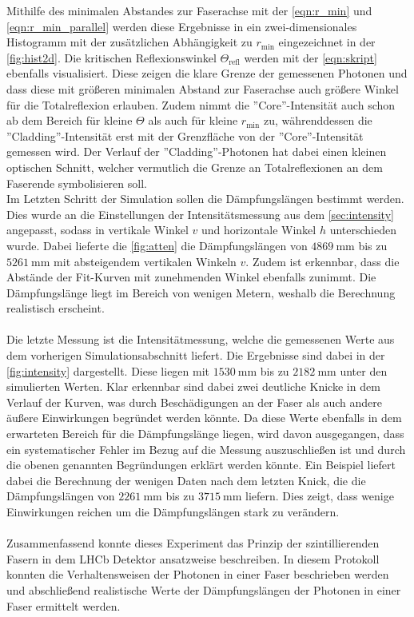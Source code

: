 Mithilfe des minimalen Abstandes zur Faserachse mit der \autoref{eqn:r_min} und \autoref{eqn:r_min_parallel} werden diese Ergebnisse in ein zwei-dimensionales Histogramm mit der zusätzlichen Abhängigkeit zu $r_{\text{min}}$ eingezeichnet in der \autoref{fig:hist2d}. Die kritischen Reflexionswinkel $\Theta_{\text{refl}}$ werden mit der \autoref{eqn:skript} ebenfalls visualisiert. Diese zeigen die klare Grenze der gemessenen Photonen und dass diese mit größeren minimalen Abstand zur Faserachse auch größere Winkel für die Totalreflexion erlauben. Zudem nimmt die ''Core''-Intensität auch schon ab dem Bereich für kleine $\Theta$ als auch für kleine $r_{\text{min}}$ zu, währenddessen die ''Cladding''-Intensität erst mit der Grenzfläche von der ''Core''-Intensität gemessen wird. Der Verlauf der ''Cladding''-Photonen hat dabei einen kleinen optischen Schnitt, welcher vermutlich die Grenze an Totalreflexionen an dem Faserende symbolisieren soll.\\
Im Letzten Schritt der Simulation sollen die Dämpfungslängen bestimmt werden. Dies wurde an die Einstellungen der Intensitätsmessung aus dem \autoref{sec:intensity} angepasst, sodass in vertikale Winkel $v$ und horizontale Winkel $h$ unterschieden wurde. Dabei lieferte die \autoref{fig:atten} die Dämpfungslängen von $\SI{4869}{\milli\meter}$ bis zu $\SI{5261}{\milli\meter}$ mit absteigendem vertikalen Winkeln $v$. Zudem ist erkennbar, dass die Abstände der Fit-Kurven mit zunehmenden Winkel ebenfalls zunimmt. Die Dämpfungslänge liegt im Bereich von wenigen Metern, weshalb die Berechnung realistisch erscheint.\\\\
Die letzte Messung ist die Intensitätmessung, welche die gemessenen Werte aus dem vorherigen Simulationsabschnitt liefert. Die Ergebnisse sind dabei in der \autoref{fig:intensity} dargestellt. Diese liegen mit $\SI{1530}{\milli\meter}$ bis zu $\SI{2182}{\milli\meter}$ unter den simulierten Werten. Klar erkennbar sind dabei zwei deutliche Knicke in dem Verlauf der Kurven, was durch Beschädigungen an der Faser als auch andere äußere Einwirkungen begründet werden könnte. Da diese Werte ebenfalls in dem erwarteten Bereich für die Dämpfungslänge liegen, wird davon ausgegangen, dass ein systematischer Fehler im Bezug auf die Messung auszuschließen ist und durch die obenen genannten Begründungen erklärt werden könnte. Ein Beispiel liefert dabei die Berechnung der wenigen Daten nach dem letzten Knick, die die Dämpfungslängen von $\SI{2261}{\milli\meter}$ bis zu $\SI{3715}{\milli\meter}$ liefern. Dies zeigt, dass wenige Einwirkungen reichen um die Dämpfungslängen stark zu verändern.\\\\
Zusammenfassend konnte dieses Experiment das Prinzip der szintillierenden Fasern in dem LHCb Detektor ansatzweise beschreiben. In diesem Protokoll konnten die Verhaltensweisen der Photonen in einer Faser beschrieben werden und abschließend realistische Werte der Dämpfungslängen der Photonen in einer Faser ermittelt werden.